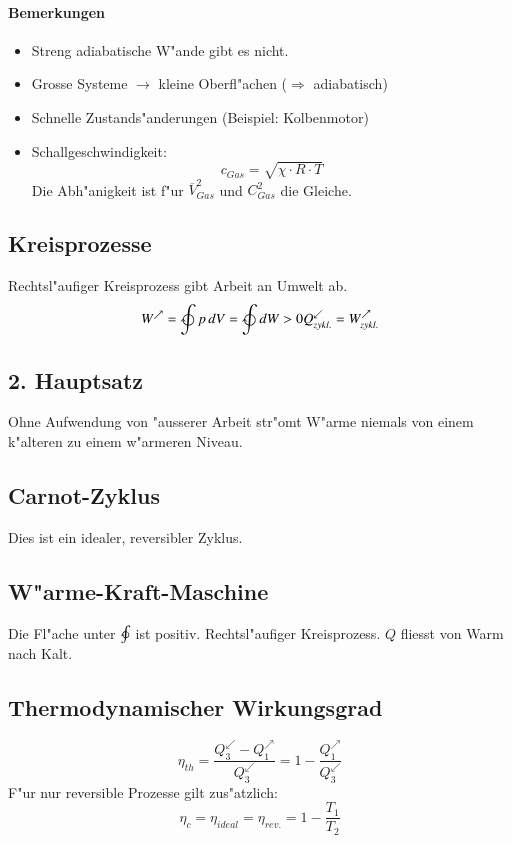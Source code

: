 \paragraph{Bemerkungen}
\begin{itemize}
	\item Streng adiabatische W"ande gibt es nicht.
	\item Grosse Systeme $\rightarrow$ kleine Oberfl"achen ($\Rightarrow$ adiabatisch)
	\item Schnelle Zustands"anderungen (Beispiel: Kolbenmotor)
	\item Schallgeschwindigkeit: $$c_{Gas}=\sqrt{\chi\cdot R\cdot T}$$ Die Abh"anigkeit ist f"ur $\overline{V}_{Gas}^2$ und $C_{Gas}^2$ die Gleiche.
\end{itemize}

\subsection{Kreisprozesse}
Rechtsl"aufiger Kreisprozess gibt Arbeit an Umwelt ab.
\begin{gather}
	W^\nearrow=\ointclockwise p\,dV=\ointclockwise dW > 0
	Q_{zykl.}^\swarrow = W_{zykl.}^\nearrow
\end{gather}

\subsection{2. Hauptsatz}
Ohne Aufwendung von "ausserer Arbeit str"omt W"arme niemals von einem k"alteren zu einem w"armeren Niveau.

\subsection{Carnot-Zyklus}
Dies ist ein idealer, reversibler Zyklus.

\subsection{W"arme-Kraft-Maschine}
Die Fl"ache unter $\ointclockwise$ ist positiv. Rechtsl"aufiger Kreisprozess. $Q$ fliesst von Warm nach Kalt.

\subsection{Thermodynamischer Wirkungsgrad}
\begin{equation}
	\eta_{th} =\frac{Q_3^\swarrow-Q_1^\nearrow}{Q_3^\swarrow}=1-\frac{Q_1^\nearrow}{Q_3^\swarrow}
\end{equation}
\noindent F"ur nur reversible Prozesse gilt zus"atzlich:
\begin{equation}
	\eta_c=\eta_{ideal}=\eta_{rev.}=1-\frac{T_1}{T_2}
\end{equation}

